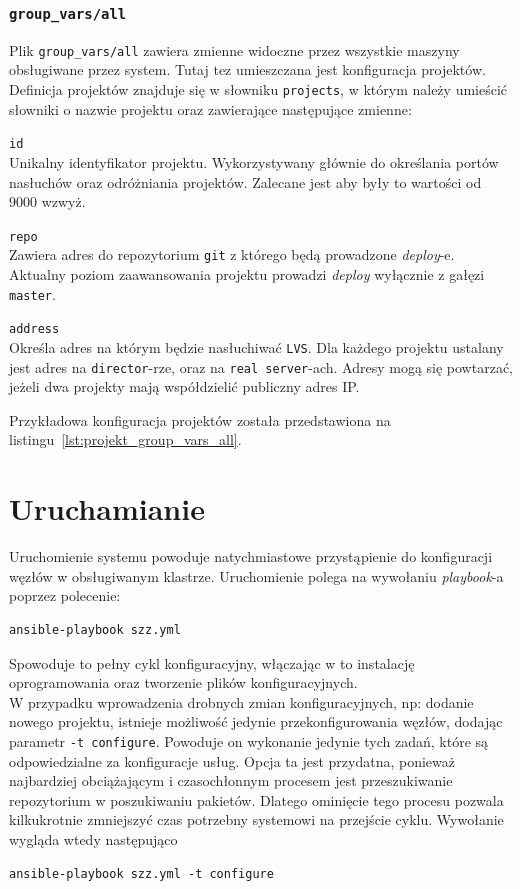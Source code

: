 \subsubsection{\texttt{group\_vars/all}}
Plik \texttt{group\_vars/all} zawiera zmienne widoczne przez wszystkie maszyny obsługiwane przez system.
Tutaj tez umieszczana jest konfiguracja projektów.
Definicja projektów znajduje się w słowniku \texttt{projects}, w którym należy umieścić słowniki o nazwie projektu oraz zawierające następujące zmienne:
\begin{description}
\item{\texttt{id}}\\
Unikalny identyfikator projektu.
Wykorzystywany głównie do określania portów nasłuchów oraz odróżniania projektów.
Zalecane jest aby były to wartości od $9000$ wzwyż.
\item{\texttt{repo}}\\
Zawiera adres do repozytorium \texttt{git} z którego będą prowadzone \textit{deploy}-e.
Aktualny poziom zaawansowania projektu prowadzi \textit{deploy} wyłącznie z gałęzi \texttt{master}.
\item{\texttt{address}}\\
Określa adres na którym będzie nasłuchiwać \texttt{LVS}.
Dla każdego projektu ustalany jest adres na \texttt{director}-rze, oraz na \texttt{real server}-ach.
Adresy mogą się powtarzać, jeżeli dwa projekty mają współdzielić publiczny adres IP.
\end{description}
Przykładowa konfiguracja projektów została przedstawiona na listingu~\ref{lst:projekt_group_vars_all}.

\section{Uruchamianie}
Uruchomienie systemu powoduje natychmiastowe przystąpienie do konfiguracji węzłów w obsługiwanym klastrze. Uruchomienie polega na wywołaniu \textit{playbook}-a poprzez polecenie:
\begin{lstlisting}
ansible-playbook szz.yml
\end{lstlisting}
Spowoduje to pełny cykl konfiguracyjny, włączając w to instalację oprogramowania oraz tworzenie plików konfiguracyjnych.\\
W przypadku wprowadzenia drobnych zmian konfiguracyjnych, np: dodanie nowego projektu, istnieje możliwość jedynie przekonfigurowania węzłów, dodając parametr \texttt{-t configure}.
Powoduje on wykonanie jedynie tych zadań, które są odpowiedzialne za konfiguracje usług.
Opcja ta jest przydatna, ponieważ najbardziej obciążającym i czasochłonnym procesem jest przeszukiwanie repozytorium w poszukiwaniu pakietów.
Dlatego ominięcie tego procesu pozwala kilkukrotnie zmniejszyć czas potrzebny systemowi na przejście cyklu.
Wywołanie wygląda wtedy następująco
\begin{lstlisting}
ansible-playbook szz.yml -t configure
\end{lstlisting}
